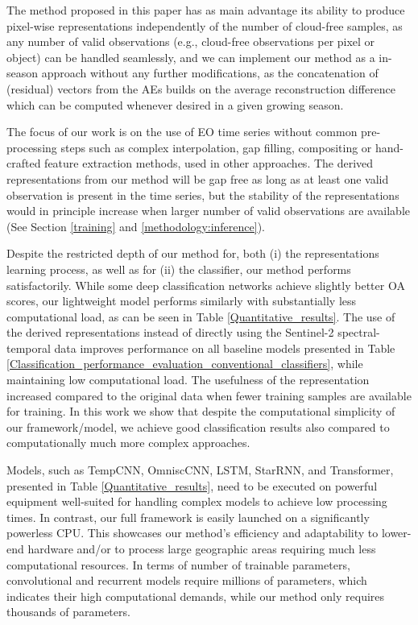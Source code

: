 \documentclass[journal,article,submit,pdftex,moreauthors]{Definitions/mdpi}
\begin{document}
The method proposed in this paper has as main advantage its ability to produce pixel-wise representations independently of the number of cloud-free samples, as any number of valid observations (e.g., cloud-free observations per pixel or object) can be handled seamlessly, and we can implement our method as a in-season approach without any further modifications, as the concatenation of (residual) vectors from the AEs builds on the average reconstruction difference which can be computed whenever desired in a given growing season.

The focus of our work is on the use of EO time series without common pre-processing steps such as complex interpolation, gap filling, compositing or hand-crafted feature extraction methods, used in other approaches. The derived representations from our method will be gap free as long as at least one valid observation is present in the time series, but the stability of the representations would in principle increase when larger number of valid observations are available (See Section \ref{training} and \ref{methodology:inference}).

Despite the restricted depth of our method for, both (i) the representations learning process, as well as for (ii) the classifier, our method performs satisfactorily.
While some deep classification networks achieve slightly better OA scores, our lightweight model performs similarly with substantially less computational load, as can be seen in Table \ref{Quantitative_results}. The use of the derived representations instead of directly using the Sentinel-2 spectral-temporal data improves performance on all baseline models presented in Table \ref{Classification_performance_evaluation_conventional_classifiers}, while maintaining low computational load. The usefulness of the representation increased compared to the original data when fewer training samples are available for training. In this work we show that despite the computational simplicity of our framework/model, we achieve good classification results also compared to computationally much more complex approaches.

Models, such as TempCNN, OmniscCNN, LSTM, StarRNN, and Transformer, presented in Table \ref{Quantitative_results}, need to be executed on powerful equipment well-suited for handling complex models to achieve low processing times. In contrast, our full framework is easily launched on a significantly powerless CPU. This showcases our method's efficiency and adaptability to lower-end hardware and/or to process large geographic areas requiring much less computational resources.
In terms of number of trainable parameters, convolutional and recurrent models require millions of parameters, which indicates their high computational demands, while our method only requires thousands of parameters.
\end{document}
